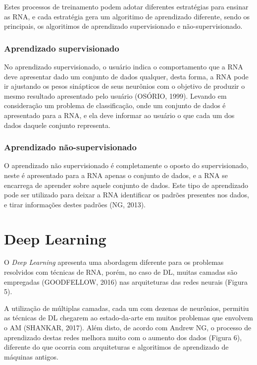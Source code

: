 Estes processos de treinamento podem adotar diferentes estratégias para ensinar as RNA, e cada estratégia gera um algoritimo de aprendizado diferente, sendo os principais, os algoritimos de aprendizado supervisionado e não-supervisionado.

\subsubsection{Aprendizado supervisionado}

No aprendizado supervisionado, o usuário indica o comportamento que a RNA deve apresentar dado um conjunto de dados qualquer, desta forma, a RNA pode ir ajustando os pesos sinápticos de seus neurônios com o objetivo de produzir o mesmo resultado apresentado pelo usuário (OSÓRIO, 1999). Levando em consideração um problema de classificação, onde um conjunto de dados é apresentado para a RNA, e ela deve informar ao usuário o que cada um dos dados daquele conjunto representa.

\subsubsection{Aprendizado não-supervisionado}

O aprendizado não supervisionado é completamente o oposto do supervisionado, neste é apresentado para a RNA apenas o conjunto de dados, e a RNA se encarrega de aprender sobre aquele conjunto de dados. Este tipo de aprendizado pode ser utilizado para deixar a RNA identificar os padrões presentes nos dados, e tirar informações destes padrões (NG, 2013). 

\section{Deep Learning}

O \textit{Deep Learning} apresenta uma abordagem diferente para os problemas resolvidos com técnicas de RNA, porém, no caso de DL, muitas camadas são empregadas (GOODFELLOW, 2016) nas arquiteturas das redes neurais (Figura 5).


A utilização de múltiplas camadas, cada um com dezenas de neurônios, permitiu as técnicas de DL chegarem ao estado-da-arte em muitos problemas que envolvem o AM (SHANKAR, 2017).  Além disto, de acordo com Andrew NG, o processo de aprendizado destas redes melhora muito com o aumento dos dados (Figura 6), diferente do que ocorria com arquiteturas e algoritimos de aprendizado de máquinas antigos.

